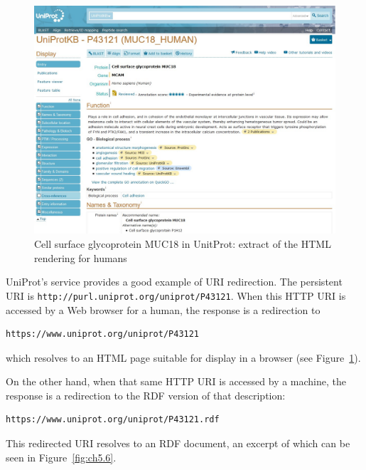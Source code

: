 \begin{figure}
    \centering
    \includegraphics[width=5.0in]{media/ch5/figure-05-05.jpg}
    \caption{Cell surface glycoprotein MUC18 in UnitProt: extract of the HTML
rendering for humans}
    \label{fig:ch5.5}
\end{figure}

UniProt's service provides a good example of URI redirection.  The persistent URI is \texttt{http://purl.uniprot.org/uniprot/P43121}.  
When this HTTP URI is accessed by a Web browser for a human,  the response is a redirection to 

\begin{lstlisting}
https://www.uniprot.org/uniprot/P43121
\end{lstlisting}

which resolves to an HTML
page suitable for display in a browser (see Figure~\ref{fig:ch5.5}).   

On the other hand, when  that same HTTP URI is accessed by a 
machine,  the
response is a redirection to the RDF version of that description:

\begin{lstlisting}
https://www.uniprot.org/uniprot/P43121.rdf
\end{lstlisting}

This redirected URI resolves to an RDF document, an excerpt of which can be seen in 
Figure~\ref{fig:ch5.6}.


